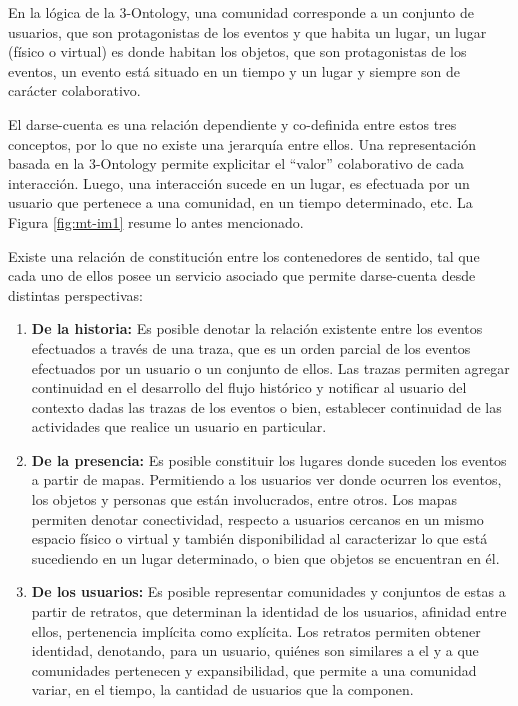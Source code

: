 En la lógica de la 3-Ontology, una comunidad corresponde a un conjunto de usuarios, que son protagonistas de los eventos y que habita un lugar, un lugar (físico o virtual) es donde habitan los objetos, que son protagonistas de los eventos, un evento está situado en un tiempo y un lugar y siempre son de carácter colaborativo.

El darse-cuenta es una relación dependiente y co-definida entre estos tres conceptos, por lo que no existe una jerarquía entre ellos. Una representación basada en la 3-Ontology permite explicitar el “valor” colaborativo de cada interacción. Luego, una interacción sucede en un lugar, es efectuada por un usuario que pertenece a una comunidad, en un tiempo determinado, etc. La Figura \ref{fig:mt-im1} resume lo antes mencionado.

Existe una relación de constitución entre los contenedores de sentido, tal que cada uno de ellos posee un servicio asociado que permite darse-cuenta desde distintas perspectivas:

\begin{enumerate}[I]
	\item \textbf{De la historia:} Es posible denotar la relación existente entre los eventos efectuados a través de una traza, que es un orden parcial de los eventos efectuados por un usuario o un conjunto de ellos. Las trazas permiten agregar continuidad en el desarrollo del flujo histórico y notificar al usuario del contexto dadas las trazas de los eventos o bien, establecer continuidad de las actividades que realice un usuario en particular.
	\item \textbf{De la presencia:} Es posible constituir los lugares donde suceden los eventos a partir de mapas. Permitiendo a los usuarios ver donde ocurren los eventos, los objetos y personas que están involucrados, entre otros. Los mapas permiten denotar conectividad, respecto a usuarios cercanos en un mismo espacio físico o virtual y también disponibilidad al caracterizar lo que está sucediendo en un lugar determinado, o bien que objetos se encuentran en él.
	\item \textbf{De los usuarios:} Es posible representar comunidades y conjuntos de estas a partir de retratos, que determinan la identidad de los usuarios, afinidad entre ellos, pertenencia implícita como explícita. Los retratos permiten obtener identidad, denotando, para un usuario, quiénes son similares a el y a que comunidades pertenecen y expansibilidad, que permite a una comunidad variar, en el tiempo, la cantidad de usuarios que la componen.
\end{enumerate}


